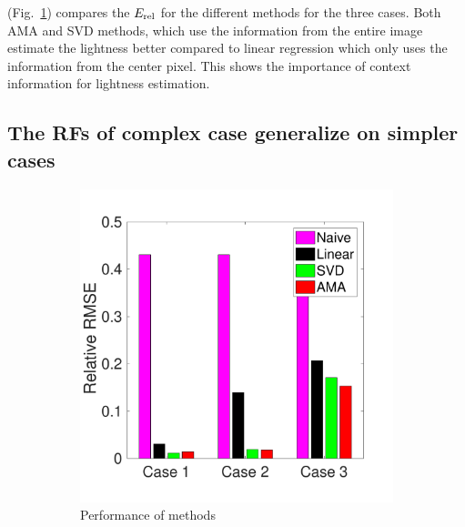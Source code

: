 \documentclass{jov}
\begin{document}
(Fig.~\ref{fig:summaryBarGraph}) compares the $E_{\rm rel}$ for the different methods for the three cases. Both AMA and SVD methods, which use the information from the entire image estimate the lightness better compared to linear regression which only uses the information from the center pixel. This shows the importance of context information for lightness estimation.

\subsection{The RFs of complex case generalize on simpler cases}
\begin{figure}
\centering
\begin{subfigure}{0.3 \textwidth}
	\includegraphics[width=\textwidth]{../Figures/Figure8/Figure8_a.pdf}
	\caption{Performance of methods}
	\label{fig:summaryBarGraph}
    \end{subfigure}
    ~ %
    \begin{subfigure}{0.3 \textwidth}   

\end{subfigure}
\end{figure}
\end{document}
